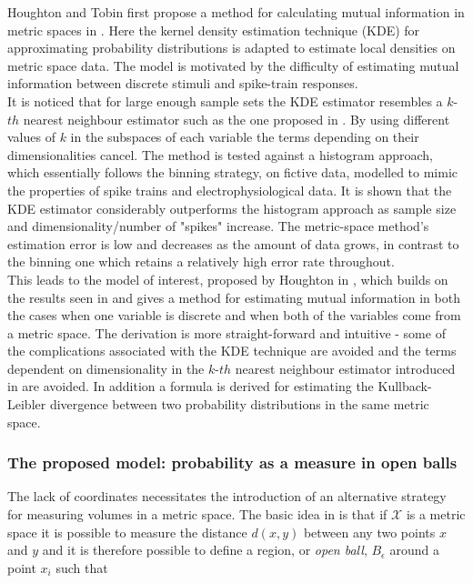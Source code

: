 \documentclass[12pt]{extarticle}
\begin{document}
\noindent
Houghton and Tobin first propose a method for calculating mutual
information in metric spaces in \cite{Tobin-Houghton}. Here the kernel density
estimation technique (KDE) for approximating probability distributions
is adapted to estimate local densities on metric space data. The model
is motivated by the difficulty of estimating mutual information
between discrete stimuli and spike-train responses.\\

\noindent 
It is noticed that for large enough sample sets the KDE estimator
resembles a $k$-$th$ nearest neighbour estimator such as the one
proposed in \cite{Kraskov}. By using different values of $k$ in the
subspaces of each variable the terms depending on their
dimensionalities cancel. The method is tested against a histogram
approach, which essentially follows the binning strategy, on fictive
data, modelled to mimic the properties of spike trains and
electrophysiological data. It is shown that the KDE estimator
considerably outperforms the histogram approach as sample size and
dimensionality/number of "spikes" increase. The metric-space method's
estimation error is low and decreases as the amount of data grows, in
contrast to the binning one which retains a relatively high error rate
throughout.\\

\noindent
This leads to the model of interest, proposed by Houghton in
\cite{Houghton}, which builds on the results seen in \cite{Tobin-Houghton} and gives
a method for estimating mutual information in both the cases when one
variable is discrete and when both of the variables come from a metric
space. The derivation is more straight-forward and intuitive - some of
the complications associated with the KDE technique are avoided 
and the terms dependent on dimensionality in the $k$-$th$ nearest
neighbour estimator introduced in \cite{Kraskov} are avoided. In addition
a formula is derived for estimating the Kullback-Leibler divergence
between two probability distributions in the same metric space.\\


\subsubsection*{The proposed model: probability as a measure in open balls}
\noindent
The lack of coordinates necessitates the introduction of an
alternative strategy for measuring volumes in a metric space. The
basic idea in \cite{Houghton} is that if $\mathcal{X}$ is a metric space
it is possible to measure the distance $d(x,y)$ between any two points
$x$ and $y$ and it is therefore possible to define a region, or
\textit{open ball}, $B_{\epsilon}$ around a point $x_i$ such that
\end{document}
